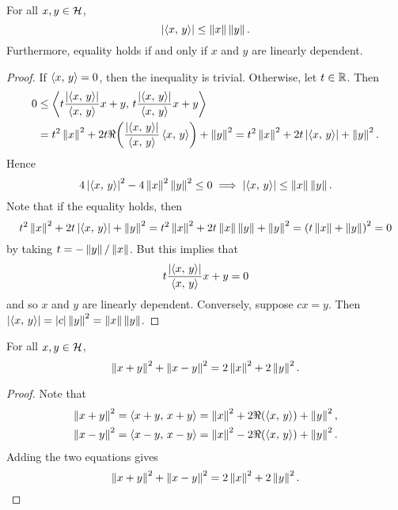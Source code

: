 \begin{proposition}
    For all $x,y\in\mathcal{H}$, 
    \begin{equation*}
        \left\lvert {\left\langle {x},\, {y} \right\rangle} \right\rvert \leq \left\lVert {x} \right\rVert\left\lVert {y} \right\rVert.
    \end{equation*}
    Furthermore, equality holds if and only if $x$ and $y$ are linearly 
    dependent.
\end{proposition}
\begin{proof}
    If $\left\langle {x},\, {y} \right\rangle = 0$, then the inequality is trivial. Otherwise, let 
    $t\in\mathbb{R}$. Then 
    \begin{equation*}
        \begin{split}
            0 &\leq \inprod{t\frac{\abs{\inprod{x}{y}}}{\inprod{x}{y}}x+y}{t\frac{\abs{\inprod{x}{y}}}{\inprod{x}{y}}x+y} \\
            &= t^2\norm{x}^2 + 2t\Re\pth{\frac{\abs{\inprod{x}{y}}}{\inprod{x}{y}}\inprod{x}{y}} + \norm{y}^2 
            = t^2\norm{x}^2 + 2t\abs{\inprod{x}{y}} + \norm{y}^2.
        \end{split}
    \end{equation*}
    Hence 
    \begin{equation*}
        4\left\lvert {\left\langle {x},\, {y} \right\rangle} \right\rvert^2 - 4\left\lVert {x} \right\rVert^2\left\lVert {y} \right\rVert^2 \leq 0
        \implies \left\lvert {\left\langle {x},\, {y} \right\rangle} \right\rvert \leq \left\lVert {x} \right\rVert\left\lVert {y} \right\rVert.
    \end{equation*}
    Note that if the equality holds, then 
    \begin{equation*}
        t^2\norm{x}^2 + 2t\abs{\inprod{x}{y}} + \norm{y}^2 
        = t^2\norm{x}^2 + 2t\norm{x}\norm{y} + \norm{y}^2  
        = \pth{t\norm{x} + \norm{y}}^2 = 0
    \end{equation*}
    by taking $t = -\left\lVert {y} \right\rVert/\left\lVert {x} \right\rVert$. But this implies that 
    \begin{equation*}
        t\frac{\left\lvert {\left\langle {x},\, {y} \right\rangle} \right\rvert}{\left\langle {x},\, {y} \right\rangle}x+y = 0
    \end{equation*}
    and so $x$ and $y$ are linearly dependent. Conversely, suppose $cx = y$.
    Then $\left\lvert {\left\langle {x},\, {y} \right\rangle} \right\rvert = \left\lvert {c} \right\rvert\left\lVert {y} \right\rVert^2 = \left\lVert {x} \right\rVert\left\lVert {y} \right\rVert$.
\end{proof}

\begin{proposition}
    For all $x,y\in\mathcal{H}$, 
    \begin{equation*}
        \left\lVert {x+y} \right\rVert^2 + \left\lVert {x-y} \right\rVert^2 = 2\left\lVert {x} \right\rVert^2 + 2\left\lVert {y} \right\rVert^2.
    \end{equation*}
\end{proposition}
\begin{proof}
    Note that 
    \begin{align*}
        \norm{x+y}^2 = \inprod{x+y}{x+y} &= \norm{x}^2 + 2\Re\pth{\inprod{x}{y}} + \norm{y}^2, \\
        \norm{x-y}^2 = \inprod{x-y}{x-y} &= \norm{x}^2 - 2\Re\pth{\inprod{x}{y}} + \norm{y}^2.
    \end{align*}
    Adding the two equations gives 
    \begin{equation*}
        \left\lVert {x+y} \right\rVert^2 + \left\lVert {x-y} \right\rVert^2 = 2\left\lVert {x} \right\rVert^2 + 2\left\lVert {y} \right\rVert^2.
    \end{equation*}
\end{proof}

